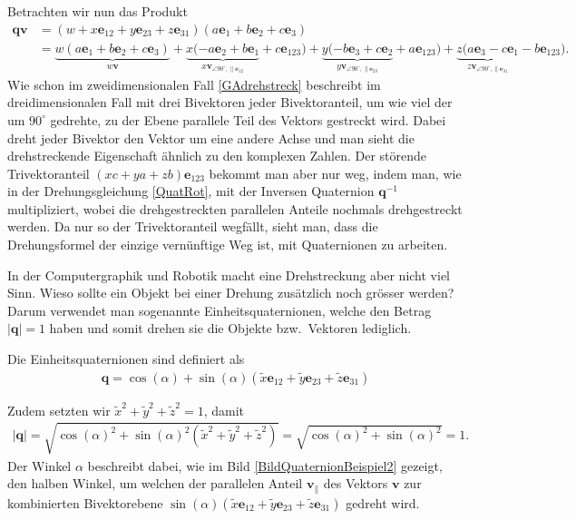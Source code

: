 Betrachten wir nun das Produkt
\begin{align*}
\mathbf{qv} &= (w + x\mathbf{e}_{12} + y\mathbf{e}_{23} + z\mathbf{e}_{31})(a\mathbf{e}_1+b\mathbf{e}_2+c\mathbf{e}_3)\\
&= \underbrace{w(a\mathbf{e}_1+b\mathbf{e}_2+c\mathbf{e}_3)}_{\displaystyle{w\mathbf{v}}} + \underbrace{x(-a\mathbf{e}_2+b\mathbf{e}_1}_{\displaystyle{x\mathbf{v}_{\angle 90^\circ, \parallel \mathbf{e}_{12}}}}+c\mathbf{e}_{123}) + \underbrace{y(-b\mathbf{e}_3+c\mathbf{e}_2}_{\displaystyle{y\mathbf{v}_{\angle 90^\circ, \parallel \mathbf{e}_{23}}}}+a\mathbf{e}_{123}) + \underbrace{z(a\mathbf{e}_3-c\mathbf{e}_1}_{\displaystyle{z\mathbf{v}_{\angle 90^\circ, \parallel \mathbf{e}_{31}}}}-b\mathbf{e}_{123}).
\end{align*}
Wie schon im zweidimensionalen Fall \eqref{GAdrehstreck} beschreibt
im dreidimensionalen Fall mit drei Bivektoren jeder Bivektoranteil,
um wie viel der um $90^\circ$ gedrehte, zu der Ebene parallele Teil
des Vektors gestreckt wird.
Dabei dreht jeder Bivektor den Vektor um eine andere Achse und man sieht die drehstreckende Eigenschaft ähnlich zu den komplexen Zahlen.
Der störende Trivektoranteil $(xc+ya+zb)\mathbf{e}_{123}$ bekommt man aber nur weg, indem man, wie in der Drehungsgleichung \eqref{QuatRot}, mit der Inversen Quaternion $\mathbf{q}^{-1}$  multipliziert, wobei die drehgestreckten parallelen Anteile nochmals drehgestreckt werden.
Da nur so der Trivektoranteil wegfällt, sieht man, dass die Drehungsformel der einzige vernünftige Weg ist, mit Quaternionen zu arbeiten.

In der Computergraphik und Robotik macht eine Drehstreckung aber nicht viel Sinn.
Wieso sollte ein Objekt bei einer Drehung zusätzlich noch grösser werden? Darum verwendet man sogenannte Einheitsquaternionen, welche den Betrag $|\mathbf{q}|=1$ haben und somit drehen sie die Objekte bzw.~Vektoren lediglich.
\begin{definition}
	Die Einheitsquaternionen sind definiert als
	\begin{align*}
	\mathbf{q} = \cos(\alpha) + \sin(\alpha)(\tilde{x}\mathbf{e}_{12} + \tilde{y}\mathbf{e}_{23} + \tilde{z}\mathbf{e}_{31})
	\end{align*}
\end{definition}
Zudem setzten wir $\tilde{x}^2+\tilde{y}^2+\tilde{z}^2=1$, damit
\begin{align*}
|\mathbf{q}| = \sqrt{\cos(\alpha)^2 + \sin(\alpha)^2(\tilde{x}^2+\tilde{y}^2+\tilde{z}^2) } = \sqrt{\cos(\alpha)^2 + \sin(\alpha)^2} = 1.
\end{align*}
Der Winkel $\alpha$ beschreibt dabei, wie im Bild \ref{BildQuaternionBeispiel2} gezeigt, den halben Winkel, um welchen der parallelen Anteil $\mathbf{v_{\parallel}}$ des Vektors $\mathbf{v}$ zur kombinierten Bivektorebene $\sin(\alpha)(\tilde{x}\mathbf{e}_{12} + \tilde{y}\mathbf{e}_{23} + \tilde{z}\mathbf{e}_{31})$ gedreht wird.


